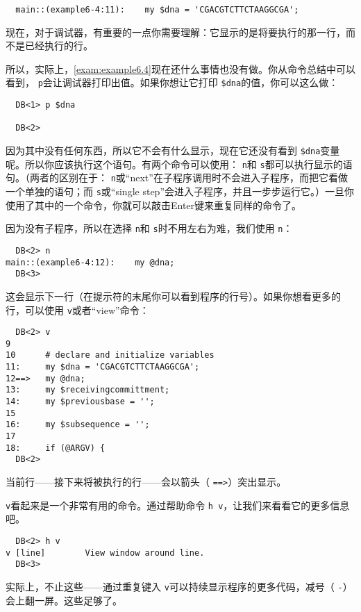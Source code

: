 \begin{lstlisting}
  main::(example6-4:11):    my $dna = 'CGACGTCTTCTAAGGCGA';
\end{lstlisting}

现在，对于调试器，有重要的一点你需要理解：它显示的是将要执行的那一行，而不是已经执行的行。

所以，实际上，\autoref{exam:example6.4}现在还什么事情也没有做。你从命令总结中可以看到， \verb|p|会让调试器打印出值。如果你想让它打印 \verb|$dna|的值，你可以这么做：

\begin{lstlisting}
  DB<1> p $dna

  DB<2> 
\end{lstlisting}

因为其中没有任何东西，所以它不会有什么显示，现在它还没有看到 \verb|$dna|变量呢。所以你应该执行这个语句。有两个命令可以使用： \verb|n|和 \verb|s|都可以执行显示的语句。（两者的区别在于： \verb|n|或“next”在子程序调用时不会进入子程序，而把它看做一个单独的语句；而 \verb|s|或“single step”会进入子程序，并且一步步运行它。）一旦你使用了其中的一个命令，你就可以敲击Enter键来重复同样的命令了。

因为没有子程序，所以在选择 \verb|n|和 \verb|s|时不用左右为难，我们使用 \verb|n|：

\begin{lstlisting}
  DB<2> n
main::(example6-4:12):    my @dna;
  DB<3> 
\end{lstlisting}

这会显示下一行（在提示符的末尾你可以看到程序的行号）。如果你想看更多的行，可以使用 \verb|v|或者“view”命令：

\begin{lstlisting}
  DB<2> v
9
10      # declare and initialize variables
11:     my $dna = 'CGACGTCTTCTAAGGCGA';
12==>   my @dna;
13:     my $receivingcommittment;
14:     my $previousbase = ''; 
15
16:     my $subsequence = '';
17
18:     if (@ARGV) {
  DB<2>
\end{lstlisting}

当前行——接下来将被执行的行——会以箭头（ \verb|==>|）突出显示。

 \verb|v|看起来是一个非常有用的命令。通过帮助命令 \verb|h v|，让我们来看看它的更多信息吧。

\begin{lstlisting}
  DB<2> h v
v [line]        View window around line.
  DB<3> 
\end{lstlisting}

实际上，不止这些——通过重复键入 \verb|v|可以持续显示程序的更多代码，减号（ \verb|-|）会上翻一屏。这些足够了。

